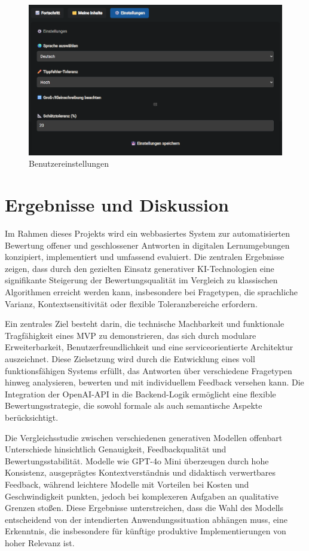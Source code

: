 \documentclass[a4paper,12pt]{article}
\begin{document}
\begin{figure}[H]
    \centering
    \includegraphics[width=1\textwidth]{Bilder/settings.png}
    \caption{Benutzereinstellungen}
    \label{fig:settings}
\end{figure}
\newpage

\section{Ergebnisse und Diskussion}

Im Rahmen dieses Projekts wird ein webbasiertes System zur automatisierten Bewertung offener und geschlossener Antworten in digitalen Lernumgebungen konzipiert, implementiert und umfassend evaluiert. Die zentralen Ergebnisse zeigen, dass durch den gezielten Einsatz generativer KI-Technologien eine signifikante Steigerung der Bewertungsqualität im Vergleich zu klassischen Algorithmen erreicht werden kann, insbesondere bei Fragetypen, die sprachliche Varianz, Kontextsensitivität oder flexible Toleranzbereiche erfordern.

Ein zentrales Ziel besteht darin, die technische Machbarkeit und funktionale Tragfähigkeit eines MVP zu demonstrieren, das sich durch modulare Erweiterbarkeit, Benutzerfreundlichkeit und eine serviceorientierte Architektur auszeichnet. Diese Zielsetzung wird durch die Entwicklung eines voll funktionsfähigen Systems erfüllt, das Antworten über verschiedene Fragetypen hinweg analysieren, bewerten und mit individuellem Feedback versehen kann. Die Integration der OpenAI-API in die Backend-Logik ermöglicht eine flexible Bewertungsstrategie, die sowohl formale als auch semantische Aspekte berücksichtigt.

Die Vergleichsstudie zwischen verschiedenen generativen Modellen offenbart Unterschiede hinsichtlich Genauigkeit, Feedbackqualität und Bewertungsstabilität. Modelle wie GPT-4o Mini überzeugen durch hohe Konsistenz, ausgeprägtes Kontextverständnis und didaktisch verwertbares Feedback, während leichtere Modelle mit Vorteilen bei Kosten und Geschwindigkeit punkten, jedoch bei komplexeren Aufgaben an qualitative Grenzen stoßen. Diese Ergebnisse unterstreichen, dass die Wahl des Modells entscheidend von der intendierten Anwendungssituation abhängen muss, eine Erkenntnis, die insbesondere für künftige produktive Implementierungen von hoher Relevanz ist.
\end{document}
